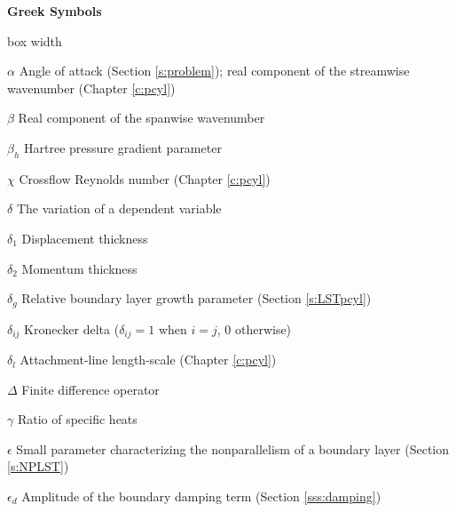 \bigskip
\centerline{\Large\bf Greek Symbols}

\begin{descriptionlist}{box width}

\item[$\alpha$]         Angle of attack (Section \ref{s:problem});
                        real component of the streamwise wavenumber (Chapter
                        \ref{c:pcyl})

\item[$\beta$]		Real component of the spanwise wavenumber

\item[$\beta_h$]	Hartree pressure gradient parameter

\item[$\chi$]		Crossflow Reynolds number (Chapter \ref{c:pcyl})

\item[$\delta$] 	The variation of a dependent variable

\item[$\delta_1$]	Displacement thickness

\item[$\delta_2$]	Momentum thickness

\item[$\delta_g$]	Relative boundary layer growth parameter
                        (Section \ref{s:LSTpcyl})

\item[$\delta_{ij}$]	Kronecker delta ($\delta_{ij} = 1$ when $i=j$, 
                        $0$ otherwise)

\item[$\delta_l$]	Attachment-line length-scale (Chapter \ref{c:pcyl})

\item[$\Delta$]		Finite difference operator

\item[$\gamma$]         Ratio of specific heats

\item[$\epsilon$]	Small parameter characterizing the 
                        nonparallelism of a boundary layer \break
			(Section \ref{s:NPLST})

\item[$\epsilon_d$]	Amplitude of the boundary damping term 
                        (Section \ref{sss:damping})



\end{descriptionlist}
